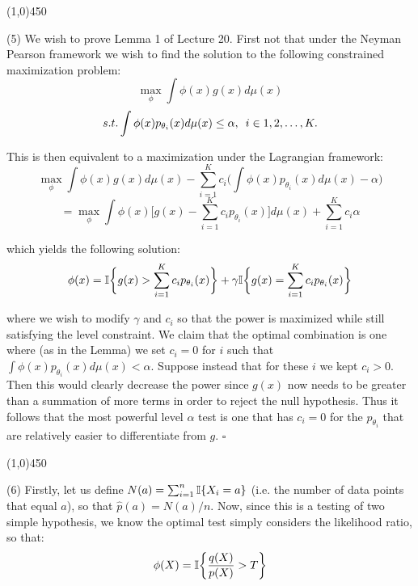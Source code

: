 \documentclass[12pt]{article}
\begin{document}
\begin{center}
\line(1,0){450}
\end{center}

\pagebreak
\noindent
(5) We wish to prove Lemma 1 of Lecture 20. First not that under the Neyman Pearson framework we wish to find the solution to the following constrained maximization problem:
$$\max_\phi \int \phi(x) g(x) d\mu(x)$$
$$s.t. \int \phi(x) p_{\theta_i}(x)d\mu(x) \leq \alpha, \hspace{5 pt} i \in 1,2,\dots,K.$$

\noindent
This is then equivalent to a maximization under the Lagrangian framework:
$$\max_\phi \int \phi(x) g(x) d\mu(x) - \sum_{i=1}^{K} c_i \biggl(\int \phi(x) p_{\theta_i}(x)d\mu(x) - \alpha \biggr)$$
$$= \max_\phi \int \phi(x) \biggl[g(x)- \sum_{i=1}^{K} c_i p_{\theta_i}(x) \biggr]d\mu(x)+\sum_{i=1}^K c_i \alpha$$

\noindent
which yields the following solution:
$$\phi(x) = \mathbb{I} \biggl\{g(x)>\sum_{i=1}^Kc_i p_{\theta_i}(x) \biggr\} + \gamma \mathbb{I}\biggl\{ g(x)=\sum_{i=1}^Kc_i p_{\theta_i}(x)\biggr\}$$

\noindent
where we wish to modify $\gamma$ and $c_i$ so that the power is maximized while still satisfying the level constraint. We claim that the optimal combination is one where (as in the Lemma) we set $c_i = 0$ for $i$ such that $\int \phi(x)p_{\theta_i}(x)d\mu(x) < \alpha$. Suppose instead that for these $i$ we kept $c_i > 0$. Then this would clearly decrease the power since $g(x)$ now needs to be greater than a summation of more terms in order to reject the null hypothesis. Thus it follows that the most powerful level $\alpha$ test is one that has $c_i=0$ for the $p_{\theta_i}$ that are relatively easier to differentiate from $g$. $\square$

\begin{center}
\line(1,0){450}
\end{center}

\noindent
(6) Firstly, let us define $N(a) = \sum_{i=1}^n \mathbb{I}\{X_i=a\}$ (i.e. the number of data points that equal $a$), so that $\hat{p}(a) = N(a) / n$. Now, since this is a testing of two simple hypothesis, we know the optimal test simply considers the likelihood ratio, so that:
$$\phi(X) = \mathbb{I} \biggl\{ \frac{q(X)}{p(X)} > T \biggr\}$$
\end{document}

